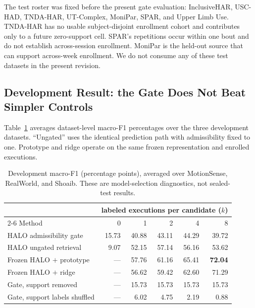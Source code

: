 The test roster was fixed before the present gate evaluation: InclusiveHAR, USC-HAD, TNDA-HAR,
UT-Complex, MoniPar, SPAR, and Upper Limb Use. TNDA-HAR has no usable subject-disjoint enrollment
cohort and contributes only to a future zero-support cell. SPAR's repetitions occur within one bout
and do not establish across-session enrollment. MoniPar is the held-out source that can support
across-week enrollment. We do not consume any of these test datasets in the present revision.

\subsection{Development Result: the Gate Does Not Beat Simpler Controls}
\label{sec:label_efficiency}

Table~\ref{tab:label_efficiency} averages dataset-level macro-F1 percentages over the three
development datasets. ``Ungated'' uses the identical prediction path with admissibility fixed to
one. Prototype and ridge operate on the same frozen representation and enrolled executions.

\begin{table}[t]
  \centering
  \caption{Development macro-F1 (percentage points), averaged over MotionSense, RealWorld, and
  Shoaib. These are model-selection diagnostics, not sealed-test results.}
  \label{tab:label_efficiency}
  \scriptsize
  \setlength{\tabcolsep}{3.0pt}
  \begin{tabular}{@{}lrrrrr@{}}
    \toprule
    & \multicolumn{5}{c}{labeled executions per candidate ($k$)} \\
    \cmidrule(lr){2-6}
    Method & 0 & 1 & 2 & 4 & 8 \\
    \midrule
    HALO admissibility gate & 15.73 & 40.88 & 43.11 & 44.29 & 39.72 \\
    HALO ungated retrieval  &  9.07 & 52.15 & 57.14 & 56.16 & 53.62 \\
    Frozen HALO $+$ prototype & --- & 57.76 & 61.16 & 65.41 & \textbf{72.04} \\
    Frozen HALO $+$ ridge     & --- & 56.62 & 59.42 & 62.60 & 71.29 \\
    \midrule
    Gate, support removed & --- & 15.73 & 15.73 & 15.73 & 15.73 \\
    Gate, support labels shuffled & --- & 6.02 & 4.75 & 2.19 & 0.88 \\
    \bottomrule
  \end{tabular}
\end{table}

